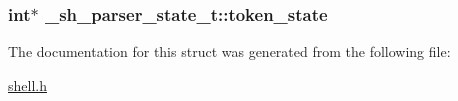 \subsubsection[{\texorpdfstring{token\+\_\+state}{token_state}}]{\setlength{\rightskip}{0pt plus 5cm}int$\ast$ \+\_\+sh\+\_\+parser\+\_\+state\+\_\+t\+::token\+\_\+state}\hypertarget{struct__sh__parser__state__t_a244829887df0a9f52b2345ca53676bbf}{}\label{struct__sh__parser__state__t_a244829887df0a9f52b2345ca53676bbf}


The documentation for this struct was generated from the following file\+:\begin{DoxyCompactItemize}
\item 
\hyperlink{shell_8h}{shell.\+h}\end{DoxyCompactItemize}
